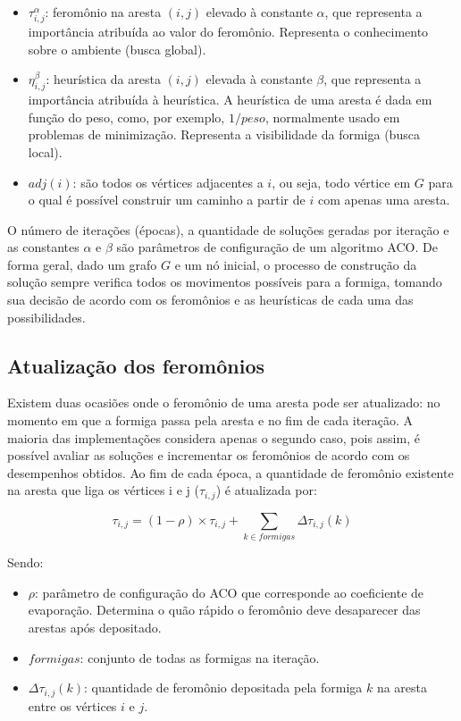 \begin{itemize}  
	\item $\tau_{i,j}^\alpha$: feromônio na aresta $(i,j)$ elevado à constante $\alpha$, que representa a importância atribuída ao valor do feromônio. Representa o conhecimento sobre o ambiente (busca global).
	\item $\eta_{i,j}^\beta$: heurística da aresta $(i,j)$ elevada à constante $\beta$, que representa a importância atribuída à heurística. A heurística de uma aresta é dada em função do peso, como, por exemplo, $1/peso$, normalmente usado em problemas de minimização. Representa a visibilidade da formiga (busca local).
	\item $adj(i)$: são todos os vértices adjacentes a $i$, ou seja, todo vértice em $G$ para o qual é possível construir um caminho a partir de $i$ com apenas uma aresta.
\end{itemize}

O número de iterações (épocas), a quantidade de soluções geradas por iteração e as constantes $\alpha$ e $\beta$ são parâmetros de configuração de um algoritmo ACO. De forma geral, dado um grafo $G$ e um nó inicial, o processo de construção da solução sempre verifica todos os movimentos possíveis para a formiga, tomando sua decisão de acordo com os feromônios e as heurísticas de cada uma das possibilidades.

\subsection{Atualização dos feromônios}
Existem duas ocasiões onde o feromônio de uma aresta pode ser atualizado: no momento em que a formiga passa pela aresta e no fim de cada iteração. A maioria das implementações considera apenas o segundo caso, pois assim, é possível avaliar as soluções e incrementar os feromônios de acordo com os desempenhos obtidos. Ao fim de cada época, a quantidade de feromônio existente na aresta que liga os vértices i e j ($\tau_{i,j}$) é atualizada por:

\begin{equation}\tau_{i,j} = (1 - \rho) \times \tau_{i,j} + \sum_{k \in formigas} \Delta\tau_{i,j}(k)\end{equation}

Sendo:

\begin{itemize}  
	\item $\rho$: parâmetro de configuração do ACO que corresponde ao coeficiente de evaporação. Determina o quão rápido o feromônio deve desaparecer das arestas após depositado.
	\item $formigas$: conjunto de todas as formigas na iteração.
	\item $\Delta\tau_{i,j}(k)$: quantidade de feromônio depositada pela formiga $k$ na aresta entre os vértices $i$ e $j$.
\end{itemize}

